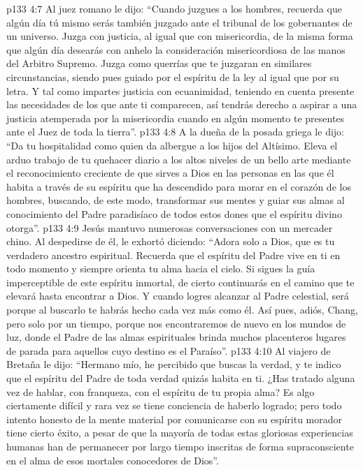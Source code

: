 \vs p133 4:7 \pc Al juez romano le dijo: “Cuando juzgues a los hombres, recuerda que algún día tú mismo serás también juzgado ante el tribunal de los gobernantes de un universo. Juzga con justicia, al igual que con misericordia, de la misma forma que algún día desearás con anhelo la consideración misericordiosa de las manos del Arbitro Supremo. Juzga como querrías que te juzgaran en similares circunstancias, siendo pues guiado por el espíritu de la ley al igual que por su letra. Y tal como impartes justicia con ecuanimidad, teniendo en cuenta presente las necesidades de los que ante ti comparecen, así tendrás derecho a aspirar a una justicia atemperada por la misericordia cuando en algún momento te presentes ante el Juez de toda la tierra”.
\vs p133 4:8 \pc A la dueña de la posada griega le dijo: “Da tu hospitalidad como quien da albergue a los hijos del Altísimo. Eleva el arduo trabajo de tu quehacer diario a los altos niveles de un bello arte mediante el reconocimiento creciente de que sirves a Dios en las personas en las que él habita a través de su espíritu que ha descendido para morar en el corazón de los hombres, buscando, de este modo, transformar sus mentes y guiar sus almas al conocimiento del Padre paradisíaco de todos estos dones que el espíritu divino otorga”.
\vs p133 4:9 \pc Jesús mantuvo numerosas conversaciones con un mercader chino. Al despedirse de él, le exhortó diciendo: “Adora solo a Dios, que es tu verdadero ancestro espiritual. Recuerda que el espíritu del Padre vive en ti en todo momento y siempre orienta tu alma hacia el cielo. Si sigues la guía imperceptible de este espíritu inmortal, de cierto continuarás en el camino que te elevará hasta encontrar a Dios. Y cuando logres alcanzar al Padre celestial, será porque al buscarlo te habrás hecho cada vez más como él. Así pues, adiós, Chang, pero solo por un tiempo, porque nos encontraremos de nuevo en los mundos de luz, donde el Padre de las almas espirituales brinda muchos placenteros lugares de parada para aquellos cuyo destino es el Paraíso”.
\vs p133 4:10 \pc Al viajero de Bretaña le dijo: “Hermano mío, he percibido que buscas la verdad, y te indico que el espíritu del Padre de toda verdad quizás habita en ti. ¿Has tratado alguna vez de hablar, con franqueza, con el espíritu de tu propia alma? Es algo ciertamente difícil y rara vez se tiene conciencia de haberlo logrado; pero todo intento honesto de la mente material por comunicarse con su espíritu morador tiene cierto éxito, a pesar de que la mayoría de todas estas gloriosas experiencias humanas han de permanecer por largo tiempo inscritas de forma supraconsciente en el alma de esos mortales conocedores de Dios”.
